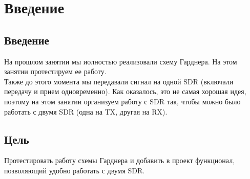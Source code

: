 \chapter{Введение}
\label{ch:intro}

\section{Введение} 

На прошлом занятии мы иолностью реализовали схему Гарднера. На этом занятии протестируем ее работу. \\

Также до этого момента мы передавали сигнал на одной SDR (включали передачу и прием одновременно). Как оказалось, это не самая хорошая идея,
поэтому на этом занятии организуем работу с SDR так, чтобы можно было работать с двумя SDR (одна на TX, другая на RX).

\section{Цель} 

Протестировать работу схемы Гарднера и добавить в проект функционал, позволяющий удобно работать с двумя SDR.
\endinput